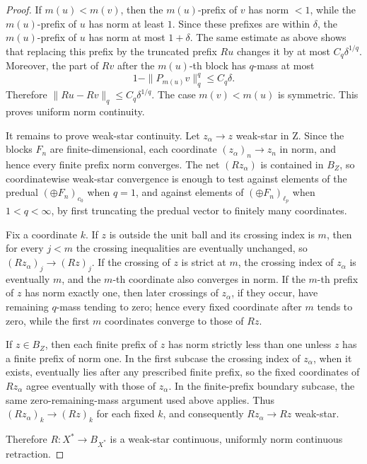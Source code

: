\documentclass[11pt]{article}
\begin{document}
\begin{proof}
If \(m(u)<m(v)\), then the \(m(u)\)-prefix of \(v\) has norm \(<1\), while the
\(m(u)\)-prefix of \(u\) has norm at least \(1\).  Since these prefixes are
within \(\delta\), the \(m(u)\)-prefix of \(u\) has norm at most \(1+\delta\).
The same estimate as above shows that replacing this prefix by the truncated
prefix \(Ru\) changes it by at most \(C_q\delta^{1/q}\).  Moreover, the part
of \(Rv\) after the \(m(u)\)-th block has \(q\)-mass at most
\[
  1-\|P_{m(u)}v\|_q^q \le C_q\delta .
\]
Therefore \(\|Ru-Rv\|_q\le C_q\delta^{1/q}\).  The case \(m(v)<m(u)\) is
symmetric.  This proves uniform norm continuity.

It remains to prove weak-star continuity.  Let \(z_\alpha\to z\) weak-star in
Z.  Since the blocks \(F_n\) are finite-dimensional, each coordinate
\((z_\alpha)_n\to z_n\) in norm, and hence every finite prefix norm converges.
The net \((Rz_\alpha)\) is contained in \(B_Z\), so coordinatewise weak-star
convergence is enough to test against elements of the predual
\((\oplus F_n)_{c_0}\) when \(q=1\), and against elements of
\((\oplus F_n)_{\ell_p}\) when \(1<q<\infty\), by first truncating the
predual vector to finitely many coordinates.

Fix a coordinate \(k\).  If \(z\) is outside the unit ball and its crossing
index is \(m\), then for every \(j<m\) the crossing inequalities are eventually
unchanged, so \((Rz_\alpha)_j\to (Rz)_j\).  If the crossing of \(z\) is strict
at \(m\), the crossing index of \(z_\alpha\) is eventually \(m\), and the
\(m\)-th coordinate also converges in norm.  If the \(m\)-th prefix of \(z\)
has norm exactly one, then later crossings of \(z_\alpha\), if they occur,
have remaining \(q\)-mass tending to zero; hence every fixed coordinate
after \(m\) tends to zero, while the first \(m\) coordinates converge to those
of \(Rz\).

If \(z\in B_Z\), then each finite prefix of \(z\) has norm strictly less than
one unless \(z\) has a finite prefix of norm one.  In the first subcase the
crossing index of \(z_\alpha\), when it exists, eventually lies after any
prescribed finite prefix, so the fixed coordinates of \(Rz_\alpha\) agree
eventually with those of \(z_\alpha\).  In the finite-prefix boundary subcase,
the same zero-remaining-mass argument used above applies.  Thus
\((Rz_\alpha)_k\to (Rz)_k\) for each fixed \(k\), and consequently
\(Rz_\alpha\to Rz\) weak-star.

Therefore \(R:X^*\to B_{X^*}\) is a weak-star continuous, uniformly norm
continuous retraction.
\end{proof}
\end{document}
